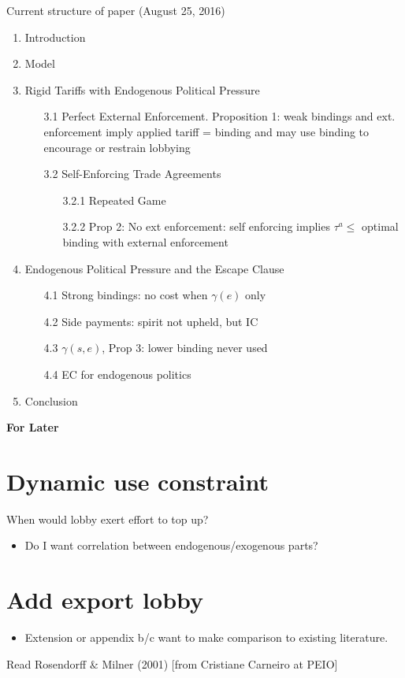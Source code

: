 \documentclass[12pt]{article}
\newcommand{\ga}{\gamma}
\begin{document}
\newpage
Current structure of paper (August 25, 2016)
\begin{enumerate}
	\item Introduction
	\item Model
	\item Rigid Tariffs with Endogenous Political Pressure
		\begin{itemize}
			\item[3.1] Perfect External Enforcement. Proposition 1: weak bindings and ext. enforcement imply applied tariff = binding and may use binding to encourage or restrain lobbying
			\item[3.2] Self-Enforcing Trade Agreements
				\begin{itemize}
					\item[3.2.1] Repeated Game
					\item[3.2.2] Prop 2: No ext enforcement: self enforcing implies $\tau^a \leq$ optimal binding with external enforcement
				\end{itemize}
		\end{itemize}
	\item Endogenous Political Pressure and the Escape Clause
		\begin{itemize}
			\item[4.1] Strong bindings: no cost when $\ga(e)$ only
			\item[4.2] Side payments: spirit not upheld, but IC
			\item[4.3] $\ga(s,e)$, Prop 3: lower binding never used
			\item[4.4] EC for endogenous politics
		\end{itemize}
	\item Conclusion
\end{enumerate}


\newpage
\begin{center}
\textbf{\large{For Later}}
\end{center}

\section{Dynamic use constraint}
When would lobby exert effort to top up?
\begin{itemize}
	\item Do I want correlation between endogenous/exogenous parts? 
\end{itemize}


\section{Add export lobby}
		\begin{itemize}
			\item Extension or appendix b/c want to make comparison to existing literature.
		\end{itemize}

Read Rosendorff $\&$ Milner (2001) [from Cristiane Carneiro at PEIO]
\end{document}
